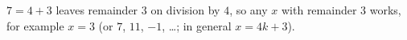 $7=4+3$ leaves remainder $3$ on division by $4$, so any $x$ with remainder $3$ works, for example $\boxed{x=3}$ (or $7$, $11$, $-1$, \dots; in general $x=4k+3$).

